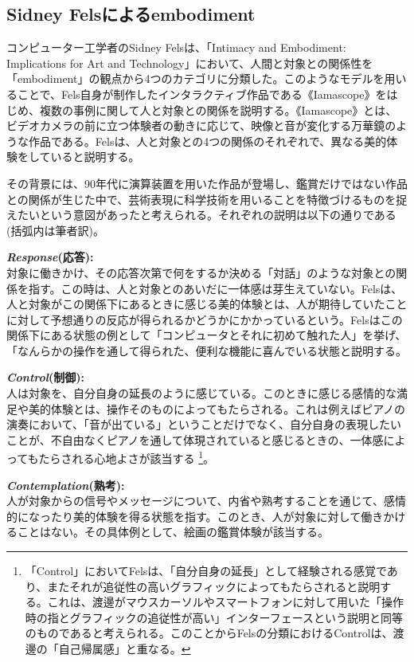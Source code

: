 \subsection{Sidney Felsによるembodiment}
コンピューター工学者のSidney Felsは、「Intimacy and Embodiment: Implications for Art and Technology」\cite{Fels}において、人間と対象との関係性を「embodiment」の観点から4つのカテゴリに分類した。このようなモデルを用いることで、Fels自身が制作したインタラクティブ作品である《Iamascope》をはじめ、複数の事例に関して人と対象との関係を説明する。《Iamascope》とは、ビデオカメラの前に立つ体験者の動きに応じて、映像と音が変化する万華鏡のような作品である。Felsは、人と対象との4つの関係のそれぞれで、異なる美的体験をしていると説明する。

その背景には、90年代に演算装置を用いた作品が登場し、鑑賞だけではない作品との関係が生じた中で、芸術表現に科学技術を用いることを特徴づけるものを捉えたいという意図があったと考えられる。それぞれの説明は以下の通りである(括弧内は筆者訳)。

\textbf{\textit{Response}(応答):}\\
対象に働きかけ、その応答次第で何をするか決める「対話」のような対象との関係を指す。この時は、人と対象とのあいだに一体感は芽生えていない。Felsは、人と対象がこの関係下にあるときに感じる美的体験とは、人が期待していたことに対して予想通りの反応が得られるかどうかにかかっているという。Felsはこの関係下にある状態の例として「コンピュータとそれに初めて触れた人」を挙げ、「なんらかの操作を通して得られた、便利な機能に喜んでいる状態と説明する。

\textbf{\textit{Control}(制御):}\\
人は対象を、自分自身の延長のように感じている。このときに感じる感情的な満足や美的体験とは、操作そのものによってもたらされる。これは例えばピアノの演奏において、「音が出ている」ということだけでなく、自分自身の表現したいことが、不自由なくピアノを通して体現されていると感じるときの、一体感によってもたらされる心地よさが該当する \footnote{「Control」においてFelsは、「自分自身の延長」として経験される感覚であり、またそれが追従性の高いグラフィックによってもたらされると説明する。これは、渡邊がマウスカーソルやスマートフォンに対して用いた「操作時の指とグラフィックの追従性が高い」インターフェースという説明と同等のものであると考えられる。このことからFelsの分類におけるControlは、渡邊の「自己帰属感」と重なる。}。

\textbf{\textit{Contemplation}(熟考):}\\
人が対象からの信号やメッセージについて、内省や熟考することを通じて、感情的になったり美的体験を得る状態を指す。このとき、人が対象に対して働きかけることはない。その具体例として、絵画の鑑賞体験が該当する。


